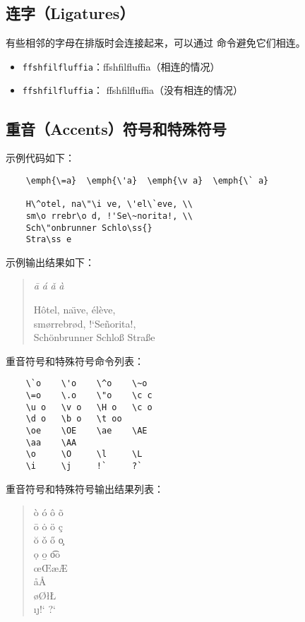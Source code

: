 \documentclass[UTF8]{ctexart}
\begin{document}
\subsection{连字（Ligatures）}
有些相邻的字母在排版时会连接起来，可以通过 \texttt{\mbox{}} 命令避免它们相连。
\begin{itemize}
    \item \texttt{ffshfilfluffia}：ffshfilfluffia（相连的情况）
    \item \texttt{f\mbox{}fshf\mbox{}ilf\mbox{}luf\mbox{}f\mbox{}ia}：
    f\mbox{}fshf\mbox{}ilf\mbox{}luf\mbox{}f\mbox{}ia（没有相连的情况）
\end{itemize}

\subsection{重音（Accents）符号和特殊符号}
示例代码如下：
\begin{verbatim}
    \emph{\=a}  \emph{\'a}  \emph{\v a}  \emph{\` a}

    H\^otel, na\"\i ve, \'el\`eve, \\
    sm\o rrebr\o d, !'Se\~norita!, \\
    Sch\"onbrunner Schlo\ss{}
    Stra\ss e
\end{verbatim}

示例输出结果如下：
\begin{quote}
    \emph{\=a} \qquad \emph{\'a} \qquad \emph{\v a} \qquad \emph{\` a}

    H\^otel, na\"\i ve, \'el\`eve, \\
    sm\o rrebr\o d, !`Se\~norita!, \\
    Sch\"onbrunner Schlo\ss{}
    Stra\ss e
\end{quote}

重音符号和特殊符号命令列表：
\begin{verbatim}
    \`o    \'o    \^o    \~o
    \=o    \.o    \"o    \c c
    \u o   \v o   \H o   \c o
    \d o   \b o   \t oo
    \oe    \OE    \ae    \AE
    \aa    \AA
    \o     \O     \l     \L
    \i     \j     !`     ?`
\end{verbatim}
\newpage
重音符号和特殊符号输出结果列表：
\begin{quote}
    \`o  \qquad  \'o  \qquad  \^o  \qquad  \~o \\
    \=o  \qquad  \.o  \qquad  \"o  \qquad  \c c \\
    \u o \qquad  \v o \qquad  \H o \qquad  \c o \\
    \d o \qquad  \b o \qquad  \t oo \\
    \oe  \qquad  \OE  \qquad  \ae  \qquad  \AE \\
    \aa  \qquad  \AA \\
    \o   \qquad  \O   \qquad  \l   \qquad  \L \\
    \i   \qquad  \j   \qquad  !`   \qquad  ?` \\
\end{quote}
\end{document}
